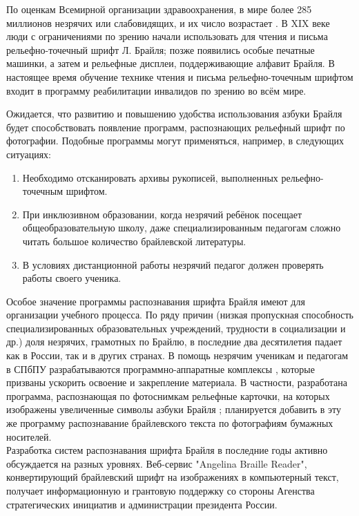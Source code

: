 \documentclass{main.tex}[subfiles]
\begin{document}
По оценкам Всемирной организации здравоохранения, в мире более 285 миллионов незрячих или слабовидящих, и их число возрастает \cite{who_report2012}.
В XIX веке люди с ограничениями по зрению начали использовать для чтения и письма рельефно-точечный шрифт Л. Брайля; позже появились особые печатные машинки, а затем и рельефные дисплеи, поддерживающие алфавит Брайля.
В настоящее время обучение технике чтения и письма рельефно-точечным шрифтом входит в программу реабилитации инвалидов по зрению во всём мире.

Ожидается, что развитию и повышению удобства использования азбуки Брайля будет способствовать появление программ, распознающих рельефный шрифт по фотографии.
Подобные программы могут применяться, например, в следующих ситуациях:
\begin{enumerate}[noitemsep]
    \item Необходимо отсканировать архивы рукописей, выполненных рельефно-точечным шрифтом.
	\item При инклюзивном образовании, когда незрячий ребёнок посещает общеобразовательную школу, даже специализированным педагогам сложно читать большое количество брайлевской литературы.
    \item В условиях дистанционной работы незрячий педагог должен проверять работы своего ученика.
\end{enumerate}

Особое значение программы распознавания шрифта Брайля имеют для организации учебного процесса.
По ряду причин (низкая пропускная способность специализированных образовательных учреждений, трудности в социализации и др.) доля незрячих, грамотных по Брайлю, в последние два десятилетия падает как в России, так и в других странах.
В помощь незрячим ученикам и педагогам в СПбПУ разрабатываются программно-аппаратные комплексы \cite{begun2019, zuev2021}, которые призваны ускорить освоение и закрепление материала.
В частности, разработана программа, распознающая по фотоснимкам рельефные карточки, на которых изображены увеличенные символы азбуки Брайля \cite{zuev2021}; планируется добавить в эту же программу распознавание брайлевского текста по фотографиям бумажных носителей. \\

Разработка систем распознавания шрифта Брайля в последние годы активно обсуждается на разных уровнях.
Веб-сервис "Angelina Braille Reader"\hspace{0pt}, конвертирующий брайлевский шрифт на изображениях в компьютерный текст, получает информационную и грантовую поддержку со стороны Агенства стратегических инициатив и администрации президента России.
\end{document}
